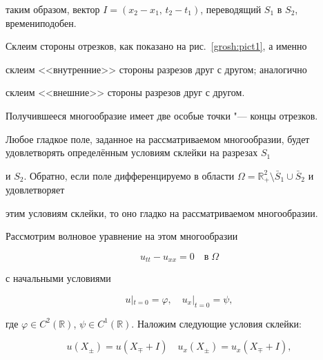 таким образом, вектор $I = (x_2-x_1, \, t_2-t_1)$, переводящий $S_1$ в $S_2$, времениподобен.



Склеим стороны отрезков, как показано на рис.~\ref{grosh:pict1}, а именно

склеим <<внутренние>> стороны разрезов друг с другом; аналогично

склеим <<внешние>> стороны разрезов друг с другом. 

Получившееся многообразие имеет две особые точки "--- концы отрезков.







Любое гладкое поле, заданное на рассматриваемом многообразии, будет удовлетворять определённым условиям склейки на разрезах $S_1$

и $S_2$. Обратно, если поле дифференцируемо в области $\Omega = \mathbb  R^2_+ \setminus \bar S_1 \cup \bar S_2$ и удовлетворяет

этим условиям склейки, то оно гладко на рассматриваемом многообразии.



Рассмотрим волновое уравнение на этом многообразии

\begin{equation}

\label{gro:FIRST}

  u_{tt} - u_{xx} = 0 \quad \text{в}\; \Omega

\end{equation}

с начальными условиями

\begin{equation}


 u|_{t=0} = \varphi,\quad 

 u_x|_{t=0} = \psi, \label{gro:MIDDLE}

\end{equation}

где $\varphi \in C^2(\mathbb  R)$, $\psi\in C^1(\mathbb  R)$. Наложим следующие условия склейки:

\begin{equation}


 u(X_{\pm}) = u(X_\mp + I)\quad 

 u_x(X_{\pm}) = u_x(X_\mp + I),

 \label{gro:LAST}

\end{equation}

